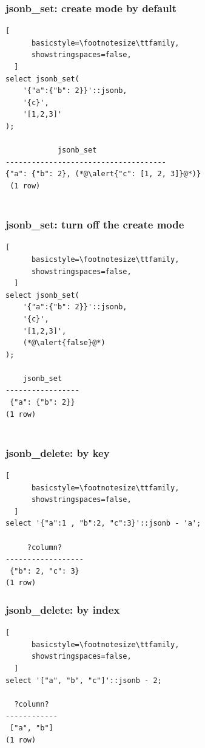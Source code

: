 \documentclass[14pt, compress]{beamer}
\begin{document}
\begin{frame}[fragile]
  \frametitle{jsonb\_set: create mode by default}

  \begin{lstlisting}[
      basicstyle=\footnotesize\ttfamily,
      showstringspaces=false,
  ]
select jsonb_set(
    '{"a":{"b": 2}}'::jsonb,
    '{c}',
    '[1,2,3]'
);

            jsonb_set                                 
-------------------------------------
{"a": {"b": 2}, (*@\alert{"c": [1, 2, 3]}@*)}
 (1 row)
 
  \end{lstlisting}

\end{frame}

\begin{frame}[fragile]
  \frametitle{jsonb\_set: turn off the create mode}

  \begin{lstlisting}[
      basicstyle=\footnotesize\ttfamily,
      showstringspaces=false,
  ]
select jsonb_set(
    '{"a":{"b": 2}}'::jsonb,
    '{c}',
    '[1,2,3]',
    (*@\alert{false}@*)
);

    jsonb_set    
-----------------
 {"a": {"b": 2}}
(1 row)
 
  \end{lstlisting}

\end{frame}

\begin{frame}[fragile]
  \frametitle{jsonb\_delete: by key}

  \begin{lstlisting}[
      basicstyle=\footnotesize\ttfamily,
      showstringspaces=false,
  ]
select '{"a":1 , "b":2, "c":3}'::jsonb - 'a';

     ?column?     
------------------
 {"b": 2, "c": 3}
(1 row)

  \end{lstlisting}
\end{frame}

\begin{frame}[fragile]
  \frametitle{jsonb\_delete: by index}

  \begin{lstlisting}[
      basicstyle=\footnotesize\ttfamily,
      showstringspaces=false,
  ]
select '["a", "b", "c"]'::jsonb - 2;

  ?column?  
------------
 ["a", "b"]
(1 row)

  \end{lstlisting}
\end{frame}
\end{document}
